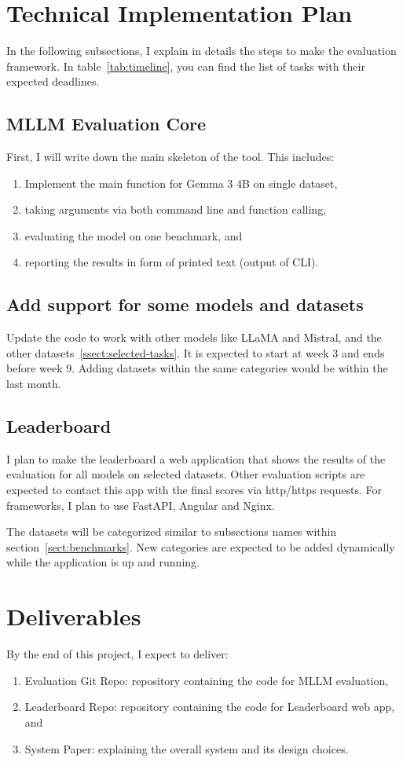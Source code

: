 \documentclass[
	letterpaper, %
]{jdf}
\begin{document}
\section{Technical Implementation Plan}
In the following subsections, I explain in details the steps to make the evaluation framework.
In table~\ref{tab:timeline}, you can find the list of tasks with their expected deadlines.

\subsection{MLLM Evaluation Core}
First, I will write down the main skeleton of the tool.
This includes: 
\begin{enumerate}
         \item Implement the main function for Gemma 3 4B on single dataset,
         \item taking arguments via both command line and function calling,
         \item evaluating the model on one benchmark, and
         \item reporting the results in form of printed text (output of CLI).
              \end{enumerate}
\subsection{Add support for some models and datasets}
Update the code to work with other models like LLaMA and Mistral, and the other datasets~\ref{ssect:selected-tasks}.
It is expected to start at week 3 and ends before week 9.
Adding datasets within the same categories would be within the last month.
\subsection{Leaderboard}
I plan to make the leaderboard a web application that shows the results of the evaluation for all models on selected datasets.
Other evaluation scripts are expected to contact this app with the final scores via http/https requests.
For frameworks, I plan to use FastAPI, Angular and Nginx.

The datasets will be categorized similar to subsections names within section~\ref{sect:benchmarks}.
New categories are expected to be added dynamically while the application is up and running.

\section{Deliverables}
By the end of this project, I expect to deliver:
\begin{enumerate}
         \item Evaluation Git Repo: repository containing the code for MLLM evaluation,
         \item Leaderboard Repo: repository containing the code for Leaderboard web app, and
         \item System Paper: explaining the overall system and its design choices.
              \end{enumerate}
\end{document}
